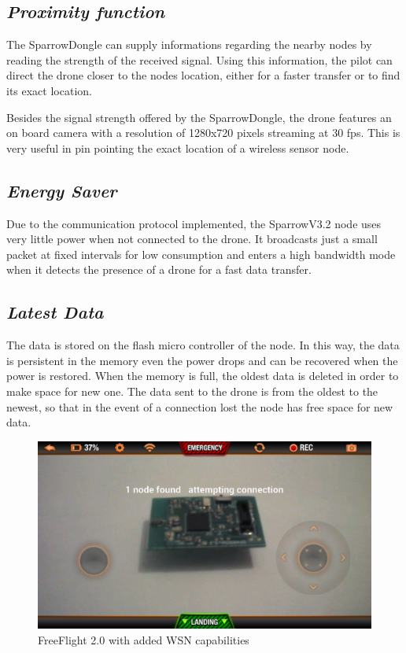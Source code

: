 \subsection{\textit{Proximity function}} 

\label{sec:prox}

The SparrowDongle can supply informations regarding the nearby nodes by reading the strength of the received signal. Using this information, the pilot can direct the drone closer to the nodes location, either for a faster transfer or to find its exact location\cite{yedavalli2005ecolocation}. 

Besides the signal strength offered by the SparrowDongle, the drone features an on board camera with a resolution of 1280x720 pixels streaming at 30 fps. This is very useful in pin pointing the exact location of a wireless sensor node.


\subsection{\textit{Energy Saver}} 

\label{sec:eng}

Due to the communication protocol implemented, the SparrowV3.2 node uses very little power when not connected to the drone. It broadcasts just a small packet at fixed intervals for low consumption and enters a high bandwidth mode when it detects the presence of a drone for a fast data transfer.\cite{cardei2005improving}


\subsection{\textit{Latest Data}} 

\label{sec:data}

The data is stored on the flash micro controller of the node. In this way, the data is persistent in the memory even the power drops and can be recovered when the power is restored. When the memory is full, the oldest data is deleted in order to make space for new one. The data sent to the drone is from the oldest to the newest, so that in the event of a connection lost the node has free space for new data. 


\begin{figure}[ht] \centering
\includegraphics[width=1\textwidth]{img/app.png}
\caption{FreeFlight 2.0 with added WSN capabilities } \end{figure}
 



